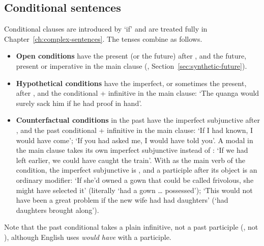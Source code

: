 \subsection{Conditional sentences}\label{sec:conditional-sentences}
Conditional clauses are introduced by  `if' and are treated fully in Chapter~\ref{ch:complex-sentences}. The tenses combine as follows.
\begin{itemize}
    \item \textbf{Open conditions} have the present (or the future) after , and the future, present or imperative in the main clause (, Section~\ref{sec:synthetic-future}).
    \item \textbf{Hypothetical conditions} have the imperfect, or sometimes the present, after , and the conditional  + infinitive in the main clause:  `The quanga would surely sack him if he had proof in hand'.
    \item \textbf{Counterfactual conditions} in the past have the imperfect subjunctive after , and the past conditional  + infinitive in the main clause:  `If I had known, I would have come';  `If you had asked me, I would have told you'. A modal in the main clause takes its own imperfect subjunctive instead of :  `If we had left earlier, we could have caught the train'. With  as the main verb of the condition, the imperfect subjunctive is , and a participle after its object is an ordinary modifier:  `If she'd owned a gown that could be called frivolous, she might have selected it' (literally `had a gown \ldots{} possessed');  `This would not have been a great problem if the new wife had had daughters' (`had daughters brought along').
\end{itemize}
Note that the past conditional takes a plain infinitive, not a past participle (, not ), although English uses \textit{would have} with a participle.

